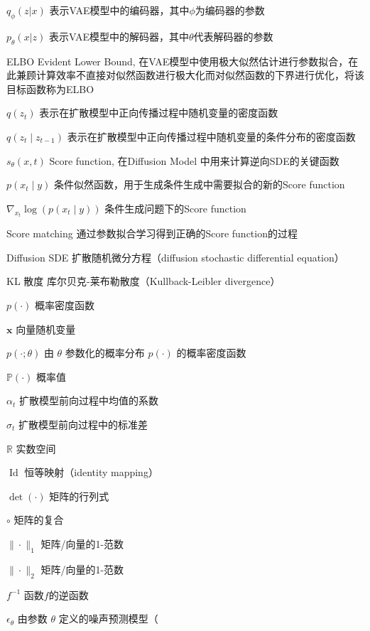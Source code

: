 
\begin{denotation}[3cm]
  \item[$q_{\phi}(z|x)$] 表示VAE模型中的编码器，其中$\phi$为编码器的参数
  \item [$p_{\theta}(x|z)$] 表示VAE模型中的解码器，其中$\theta$代表解码器的参数
  \item [ELBO] Evident Lower Bound, 在VAE模型中使用极大似然估计进行参数拟合，在此兼顾计算效率不直接对似然函数进行极大化而对似然函数的下界进行优化，将该目标函数称为ELBO
  \item [$q(z_t)$]表示在扩散模型中正向传播过程中随机变量的密度函数
  \item [$q(z_t\mid z_{t-1})$] 表示在扩散模型中正向传播过程中随机变量的条件分布的密度函数
  \item [$s_{\theta}(x,t)$] Score function, 在Diffusion Model 中用来计算逆向SDE的关键函数
  \item [$p({x}_t\mid y)$] 条件似然函数，用于生成条件生成中需要拟合的新的Score function
  \item [$\nabla_{{x}_t}\log\left(p({x}_t\mid y)\right)$] 条件生成问题下的Score function
  \item [Score matching] 通过参数拟合学习得到正确的Score function的过程

  \item [Diffusion SDE] 扩散随机微分方程（diffusion stochastic differential equation）

  \item [KL 散度] 库尔贝克-莱布勒散度（Kullback-Leibler divergence）
  \item [$p(\cdot)$] 概率密度函数
  \item [$\boldsymbol{x}$] 向量随机变量
  \item [$p(\cdot;\theta)$] 由 $\theta$ 参数化的概率分布 $p(\cdot)$ 的概率密度函数
  \item [$\mathbb{P}(\cdot)$] 概率值
  \item [$\alpha_t$] 扩散模型前向过程中均值的系数
  \item [$\sigma_t$] 扩散模型前向过程中的标准差
  \item [$\mathbb{R}$] 实数空间
  \item [$\operatorname{Id}$] 恒等映射（identity mapping）

\item [$\operatorname{det}(\cdot)$] 矩阵的行列式
\item[$\circ$] 矩阵的复合
\item[$\|\cdot \|_1$] 矩阵/向量的1-范数

\item[$\|\cdot \|_2$] 矩阵/向量的1-范数

\item[$f^{-1}$] 函数$f$的逆函数

\item[ $\epsilon_{\theta}$] 由参数 $\theta$ 定义的噪声预测模型（


  
  
  
  
  
\end{denotation}



